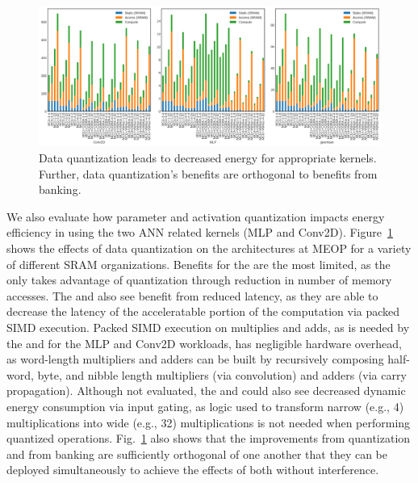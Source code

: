 \begin{figure}[h]
    \centering
    \includegraphics[width=1.0\linewidth]{./figs/high_power_energy_banking_quant.png}
    \caption{\small
        Data quantization leads to decreased energy for appropriate
        kernels.  Further, data quantization's benefits are orthogonal
        to benefits from banking.
    }
    \label{fig:banking_quant}
\end{figure}

We also evaluate how
parameter and activation quantization impacts energy efficiency in
\olfc{} using the two ANN related kernels (MLP and Conv2D).
Figure~\ref{fig:banking_quant} shows the effects of data quantization
on the architectures at MEOP for a variety of different SRAM organizations.
Benefits for the \mcu{} are the most limited, as the \mcu{} only takes advantage
of quantization through reduction in number of memory accesses.
The \cgra{} and \vmacc{} also see benefit from reduced latency, as they are able to
decrease the latency of the acceleratable portion of the computation via packed
SIMD execution. Packed SIMD execution on multiplies and adds, as is needed
by the \vmacc{} and \cgra{} for the MLP and Conv2D workloads, has negligible
hardware overhead, as word-length multipliers and adders can be built by
recursively composing half-word, byte, and nibble length multipliers
(via convolution) and adders (via carry propagation).
Although not evaluated, the \cgra{} and \vmacc{} could also see decreased
dynamic energy consumption via input gating, as logic used to transform
narrow (e.g., \SI{4}{\bit}) multiplications into wide (e.g., \SI{32}{\bit})
multiplications is not needed when performing quantized operations.
Fig.~\ref{fig:banking_quant} also shows that the improvements from quantization
and from banking are sufficiently orthogonal of one another that 
they can be deployed simultaneously to achieve the effects of both without
interference.


